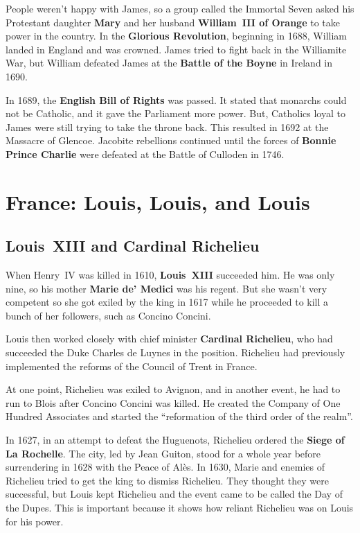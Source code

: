 People weren't happy with James,
so a group called the Immortal Seven asked his Protestant daughter
\textbf{Mary} and her husband \textbf{William~III of Orange} to take power in the country.
In the \textbf{Glorious Revolution}, beginning in 1688, William landed in England and was crowned.
James tried to fight back in the Williamite War,
but William defeated James at the \textbf{Battle of the Boyne} in Ireland in 1690.

In 1689, the \textbf{English Bill of Rights} was passed.
It stated that monarchs could not be Catholic, and it gave the Parliament more power.
But, Catholics loyal to James were still trying to take the throne back.
This resulted in 1692 at the Massacre of Glencoe.
Jacobite rebellions continued until the forces of
\textbf{Bonnie Prince Charlie} were defeated at the Battle of Culloden in 1746.

\section{France: Louis, Louis, and Louis}

\subsection*{Louis~XIII and Cardinal Richelieu}

When Henry~IV was killed in 1610, \textbf{Louis~XIII} succeeded him.
He was only nine, so his mother \textbf{Marie de' Medici} was his regent.
But she wasn't very competent so she got exiled by the king in 1617
while he proceeded to kill a bunch of her followers, such as Concino Concini.

Louis then worked closely with chief minister \textbf{Cardinal Richelieu},
who had succeeded the Duke Charles de Luynes in the position.
Richelieu had previously implemented the reforms of the Council of Trent in France.

At one point, Richelieu was exiled to Avignon,
and in another event, he had to run to Blois after Concino Concini was killed.
He created the Company of One Hundred Associates
and started the ``reformation of the third order of the realm''.

In 1627, in an attempt to defeat the Huguenots, Richelieu ordered the \textbf{Siege of La Rochelle}.
The city, led by Jean Guiton, stood for a whole year before surrendering in 1628 with the Peace of Al\`es.
In 1630, Marie and enemies of Richelieu tried to get the king to dismiss Richelieu.
They thought they were successful,
but Louis kept Richelieu and the event came to be called the Day of the Dupes.
This is important because it shows how reliant Richelieu was on Louis for his power.

